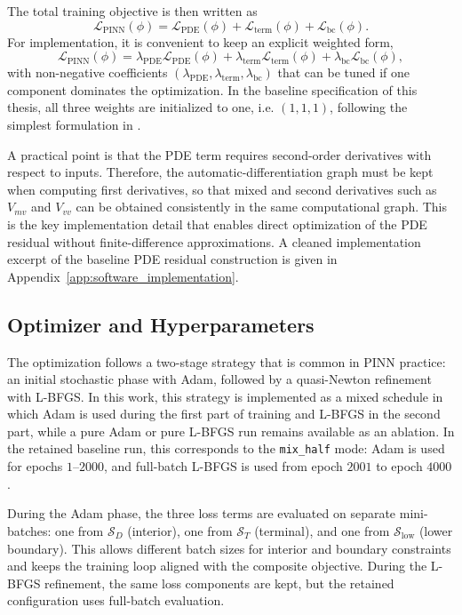 The total training objective is then written as
\begin{equation}
\mathcal{L}_{\mathrm{PINN}}(\phi)=
\mathcal{L}_{\mathrm{PDE}}(\phi)+
\mathcal{L}_{\mathrm{term}}(\phi)+
\mathcal{L}_{\mathrm{bc}}(\phi).
\end{equation}
For implementation, it is convenient to keep an explicit weighted form,
\begin{equation}
\mathcal{L}_{\mathrm{PINN}}(\phi)=
\lambda_{\mathrm{PDE}}\mathcal{L}_{\mathrm{PDE}}(\phi)+
\lambda_{\mathrm{term}}\mathcal{L}_{\mathrm{term}}(\phi)+
\lambda_{\mathrm{bc}}\mathcal{L}_{\mathrm{bc}}(\phi),
\end{equation}
with non-negative coefficients $(\lambda_{\mathrm{PDE}},\lambda_{\mathrm{term}},\lambda_{\mathrm{bc}})$ that can be tuned if one component dominates the optimization. In the baseline specification of this thesis, all three weights are initialized to one, i.e. $(1,1,1)$, following the simplest formulation in \cite{hainaut2024pinn}.

A practical point is that the PDE term requires second-order derivatives with respect to inputs. Therefore, the automatic-differentiation graph must be kept when computing first derivatives, so that mixed and second derivatives such as $V_{mv}$ and $V_{vv}$ can be obtained consistently in the same computational graph. This is the key implementation detail that enables direct optimization of the PDE residual without finite-difference approximations. A cleaned implementation excerpt of the baseline PDE residual construction is given in Appendix~\ref{app:software_implementation}.

\subsection{Optimizer and Hyperparameters}

The optimization follows a two-stage strategy that is common in PINN practice: an initial stochastic phase with Adam, followed by a quasi-Newton refinement with L-BFGS. In this work, this strategy is implemented as a mixed schedule in which Adam is used during the first part of training and L-BFGS in the second part, while a pure Adam or pure L-BFGS run remains available as an ablation. In the retained baseline run, this corresponds to the \texttt{mix\_half} mode: Adam is used for epochs \(1\)--\(2000\), and full-batch L-BFGS is used from epoch \(2001\) to epoch \(4000\).

During the Adam phase, the three loss terms are evaluated on separate mini-batches: one from $\mathcal{S}_D$ (interior), one from $\mathcal{S}_T$ (terminal), and one from $\mathcal{S}_{\mathrm{low}}$ (lower boundary). This allows different batch sizes for interior and boundary constraints and keeps the training loop aligned with the composite objective. During the L-BFGS refinement, the same loss components are kept, but the retained configuration uses full-batch evaluation.

